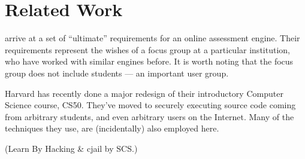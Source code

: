 
\section{Related Work}

\cite{sclater-howie-2003}  arrive at a set of ``ultimate'' requirements for an
online assessment engine. Their requirements represent the wishes of a focus
group at a particular institution, who have worked with similar engines before.
It is worth noting that the focus group does not include students --- an
important user group.

Harvard has recently done a major redesign of their introductory Computer
Science course, CS50\cite{malan-2010a}. They've moved to securely executing
source code coming from arbitrary students, and even arbitrary users on the
Internet\cite{malan-2010b,malan-2013}. Many of the techniques they use, are
(incidentally) also employed here.

(Learn By Hacking \& cjail by SCS.)

